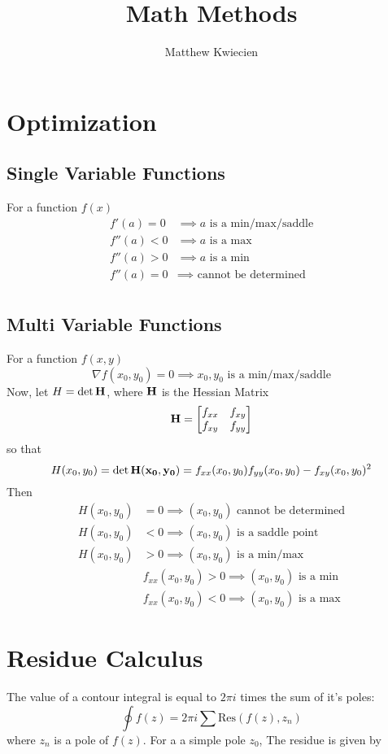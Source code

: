 \documentclass{article}
\title{Math Methods}
\author{Matthew Kwiecien}
\begin{document}
\maketitle
\section{Optimization}
\subsection{Single Variable Functions}
For a function $f(x)$
\begin{align*}
    f'(a) = 0 & \implies  a \text{ is a min/max/saddle} \\
    f''(a) < 0 & \implies a \text{ is a max} \\
    f''(a) > 0 & \implies  a \text{ is a min} \\
    f''(a) = 0 & \implies  \text{ cannot be determined} \\
\end{align*}
\subsection{Multi Variable Functions}
For a function $f(x,y)$
$$
\nabla f(x_0, y_0) = 0 \implies x_0, y_0 \text{ is a min/max/saddle}
$$
Now, let $H = \det \vb{H}$, where $\vb{H}$ is the Hessian Matrix
$$
\vb{H} = 
\begin{bmatrix}
f_{xx} & f_{xy} \\
f_{xy} & f_{yy}
\end{bmatrix}
$$
so that
$$
H(x_0, y_0) = \det \vb{H(x_0, y_0)} = f_{xx}(x_0, y_0)f_{yy}(x_0, y_0) - f_{xy}(x_0, y_0)^2
$$
Then
\begin{align*}
    H(x_0, y_0) & = 0 \implies  (x_0, y_0) \text{ cannot be determined} \\
    H(x_0, y_0) & < 0 \implies (x_0, y_0) \text{ is a saddle point} \\
    H(x_0, y_0) & > 0 \implies  (x_0, y_0) \text{ is a min/max} \\
    & f_{xx}(x_0, y_0) > 0  \implies (x_0, y_0) \text{ is a min} \\
    & f_{xx}(x_0, y_0) < 0  \implies (x_0, y_0) \text{ is a max}
\end{align*}

\section{Residue Calculus}
The value of a contour integral is equal to $2\pi i$ times the sum of it's poles:
$$
\oint f(z) = 2\pi i\sum \text{Res}(f(z), z_n)
$$
where $z_n$ is a pole of $f(z)$. For a a simple pole $z_0$, The residue is given by 
\end{document}
